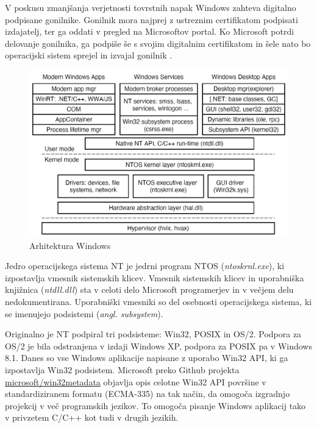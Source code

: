 \documentclass[a4paper,12pt,openright]{book}
\begin{document}
V poskusu zmanjšanja verjetnosti tovrstnih napak Windows zahteva digitalno podpisane gonilnike.
Gonilnik mora najprej z ustreznim certifikatom podpisati izdajatelj, ter ga oddati v pregled na Microsoftov portal.
Ko Microsoft potrdi delovanje gonilnika, ga podpiše še s svojim digitalnim certifikatom in šele nato bo operacijski sistem sprejel in izvajal gonilnik \cite{Yosifovich_Russinovich_Solomon_Ionescu_2017}.

\begin{figure}[h!]
	\begin{center}
		\includegraphics[width=\textwidth]{images/windows_programming_layers.png}
	\end{center}
	\caption{Arhitektura Windows \cite{Tanenbaum_Bos_2023}}
	\label{fig:windows_architecture}
\end{figure}

Jedro operacijskega sistema NT je jedrni program NTOS (\textit{ntoskrnl.exe}), ki izpostavlja vmesnik sistemskih klicev.
Vmesnik sistemskih klicev in uporabniška knjižnica (\textit{ntdll.dll}) sta v celoti delo Microsoft programerjev in v večjem delu nedokumentirana.
Uporabniški vmesniki so del osebnosti operacijskega sistema, ki se imenujejo podsistemi (\textit{angl. subsystem}).

Originalno je NT podpiral tri podsisteme: Win32, POSIX in OS/2.
Podpora za OS/2 je bila odstranjena v izdaji Windows XP, podpora za POSIX pa v Windows 8.1.
Danes so vse Windows aplikacije napisane z uporabo Win32 API, ki ga izpostavlja Win32 podsistem.
Microsoft preko Github projekta \href{https://github.com/microsoft/win32metadata}{microsoft/win32metadata} objavlja opis celotne Win32 API površine v standardiziranem formatu (ECMA-335) na tak način, da omogoča izgradnjo projekcij v več programskih jezikov.
To omogoča pisanje Windows aplikacij tako v privzetem C/C++ kot tudi v drugih jezikih.
\end{document}
